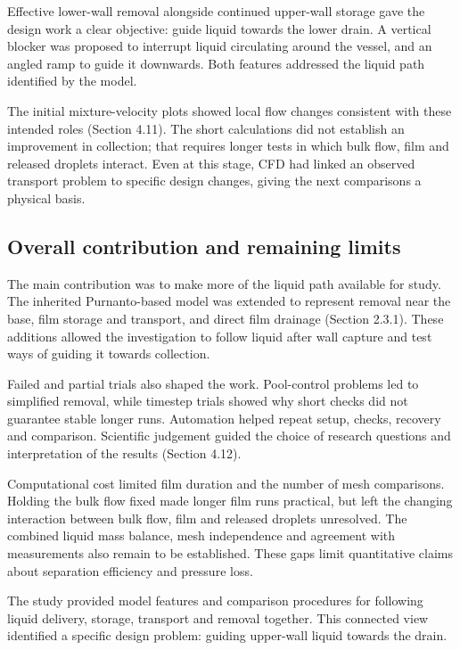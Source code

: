 \documentclass[12pt]{article}
\begin{document}
Effective lower-wall removal alongside continued upper-wall storage gave the design work a clear objective: guide liquid towards the lower drain. A vertical blocker was proposed to interrupt liquid circulating around the vessel, and an angled ramp to guide it downwards. Both features addressed the liquid path identified by the model.

The initial mixture-velocity plots showed local flow changes consistent with these intended roles (Section 4.11). The short calculations did not establish an improvement in collection; that requires longer tests in which bulk flow, film and released droplets interact. Even at this stage, CFD had linked an observed transport problem to specific design changes, giving the next comparisons a physical basis.

\subsection{Overall contribution and remaining limits}\label{overall-contribution-and-remaining-limits}

The main contribution was to make more of the liquid path available for study. The inherited Purnanto-based model was extended to represent removal near the base, film storage and transport, and direct film drainage (Section 2.3.1). These additions allowed the investigation to follow liquid after wall capture and test ways of guiding it towards collection.

Failed and partial trials also shaped the work. Pool-control problems led to simplified removal, while timestep trials showed why short checks did not guarantee stable longer runs. Automation helped repeat setup, checks, recovery and comparison. Scientific judgement guided the choice of research questions and interpretation of the results (Section 4.12).

Computational cost limited film duration and the number of mesh comparisons. Holding the bulk flow fixed made longer film runs practical, but left the changing interaction between bulk flow, film and released droplets unresolved. The combined liquid mass balance, mesh independence and agreement with measurements also remain to be established. These gaps limit quantitative claims about separation efficiency and pressure loss.

The study provided model features and comparison procedures for following liquid delivery, storage, transport and removal together. This connected view identified a specific design problem: guiding upper-wall liquid towards the drain.
\end{document}

